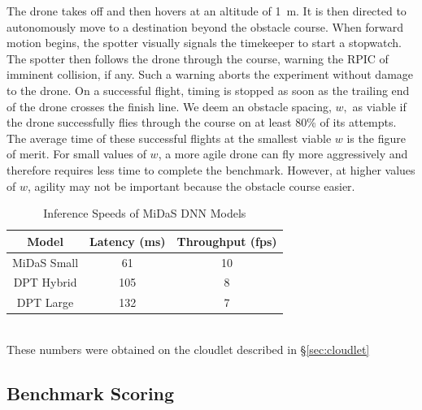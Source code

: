 The drone takes off and then hovers at an altitude of 1~m.  It
is then directed to autonomously move to a destination beyond the
obstacle course. When forward motion begins, the spotter visually
signals the timekeeper to start a stopwatch. The spotter then follows
the drone through the course, warning the RPIC of imminent collision,
if any.  Such a warning aborts the experiment without damage to the
drone.  On a successful flight, timing is stopped as soon as the
trailing end of the drone crosses the finish line.  We deem an
obstacle spacing, $w,$ as viable if the drone successfully flies
through the course on at least 80\% of its attempts.  The average time
of these successful flights at the smallest viable $w$ is the figure
of merit. For small values of $w$, a more agile drone can fly more
aggressively and therefore requires less time to complete the benchmark.
However, at higher values of $w$, agility may not be important because
the obstacle course easier.

\begin{table}
\small
	\centering
        \begin{tabular}{|c|c|c|}
		\hline
		\textbf{Model} & \textbf{Latency (ms)} & \textbf{Throughput (fps)} \\
		\hline
		MiDaS Small & 61 & 10 \\
		DPT Hybrid & 105 & 8 \\
		DPT Large & 132 & 7 \\
		\hline
	\end{tabular}
\begin{captext}
\centering
    \\[0.1cm]
  \small These numbers were obtained on the cloudlet described in
  \S\ref{sec:cloudlet}
\end{captext}
\caption{Inference Speeds of MiDaS DNN Models}
\label{tab:midas-model-stats}
\end{table}

\subsection{Benchmark Scoring}
\label{sec:avoidance-scoring}

